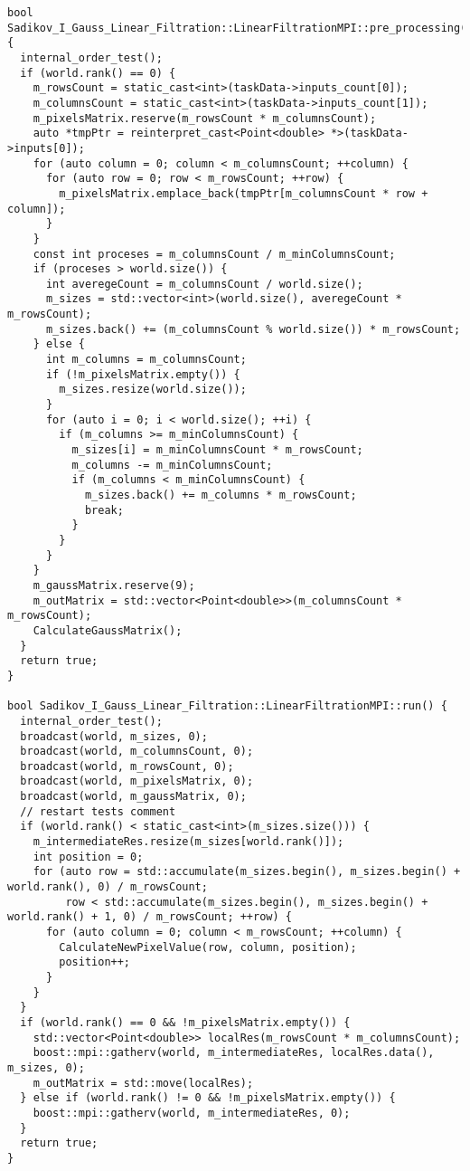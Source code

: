 \documentclass[14pt]{article}
\begin{document}
\begin{verbatim}
bool Sadikov_I_Gauss_Linear_Filtration::LinearFiltrationMPI::pre_processing() {
  internal_order_test();
  if (world.rank() == 0) {
    m_rowsCount = static_cast<int>(taskData->inputs_count[0]);
    m_columnsCount = static_cast<int>(taskData->inputs_count[1]);
    m_pixelsMatrix.reserve(m_rowsCount * m_columnsCount);
    auto *tmpPtr = reinterpret_cast<Point<double> *>(taskData->inputs[0]);
    for (auto column = 0; column < m_columnsCount; ++column) {
      for (auto row = 0; row < m_rowsCount; ++row) {
        m_pixelsMatrix.emplace_back(tmpPtr[m_columnsCount * row + column]);
      }
    }
    const int proceses = m_columnsCount / m_minColumnsCount;
    if (proceses > world.size()) {
      int averegeCount = m_columnsCount / world.size();
      m_sizes = std::vector<int>(world.size(), averegeCount * m_rowsCount);
      m_sizes.back() += (m_columnsCount % world.size()) * m_rowsCount;
    } else {
      int m_columns = m_columnsCount;
      if (!m_pixelsMatrix.empty()) {
        m_sizes.resize(world.size());
      }
      for (auto i = 0; i < world.size(); ++i) {
        if (m_columns >= m_minColumnsCount) {
          m_sizes[i] = m_minColumnsCount * m_rowsCount;
          m_columns -= m_minColumnsCount;
          if (m_columns < m_minColumnsCount) {
            m_sizes.back() += m_columns * m_rowsCount;
            break;
          }
        }
      }
    }
    m_gaussMatrix.reserve(9);
    m_outMatrix = std::vector<Point<double>>(m_columnsCount * m_rowsCount);
    CalculateGaussMatrix();
  }
  return true;
}

bool Sadikov_I_Gauss_Linear_Filtration::LinearFiltrationMPI::run() {
  internal_order_test();
  broadcast(world, m_sizes, 0);
  broadcast(world, m_columnsCount, 0);
  broadcast(world, m_rowsCount, 0);
  broadcast(world, m_pixelsMatrix, 0);
  broadcast(world, m_gaussMatrix, 0);
  // restart tests comment
  if (world.rank() < static_cast<int>(m_sizes.size())) {
    m_intermediateRes.resize(m_sizes[world.rank()]);
    int position = 0;
    for (auto row = std::accumulate(m_sizes.begin(), m_sizes.begin() + world.rank(), 0) / m_rowsCount;
         row < std::accumulate(m_sizes.begin(), m_sizes.begin() + world.rank() + 1, 0) / m_rowsCount; ++row) {
      for (auto column = 0; column < m_rowsCount; ++column) {
        CalculateNewPixelValue(row, column, position);
        position++;
      }
    }
  }
  if (world.rank() == 0 && !m_pixelsMatrix.empty()) {
    std::vector<Point<double>> localRes(m_rowsCount * m_columnsCount);
    boost::mpi::gatherv(world, m_intermediateRes, localRes.data(), m_sizes, 0);
    m_outMatrix = std::move(localRes);
  } else if (world.rank() != 0 && !m_pixelsMatrix.empty()) {
    boost::mpi::gatherv(world, m_intermediateRes, 0);
  }
  return true;
}


\end{verbatim}
\end{document}
